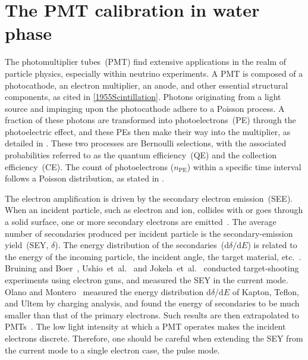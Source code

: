 \chapter{The PMT calibration in water phase}\label{sec:Introduction}
The photomultiplier tubes~(PMT) find extensive applications in the realm of particle physics, especially within neutrino experiments. A PMT is composed of a photocathode, an electron multiplier, an anode, and other essential structural components, as cited in \ref{1955Scintillation}. Photons originating from a light source and impinging upon the photocathode adhere to a Poisson process. A fraction of these photons are transformed into photoelectrons~(PE) through the photoelectric effect, and these PEs then make their way into the multiplier, as detailed in \cite{2016Optimization}. These two processes are Bernoulli selections, with the associated probabilities referred to as the quantum efficiency~(QE) and the collection efficiency~(CE). The count of photoelectrons ($n_{\mathrm{PE}}$) within a specific time interval follows a Poisson distribution, as stated in \cite{1994Absolute}.

The electron amplification is driven by the secondary electron emission~(SEE).
When an incident particle, such as electron and ion, collides with or goes through a solid surface, one or more secondary electrons are emitted~\cite{2016Secondary}.
The average number of secondaries produced per incident particle is the secondary-emission yield~(SEY, $\delta$).
The energy distribution of the secondaries~(\(\mathrm{d}\delta/\mathrm{d}E\)) is related to the energy of the incoming particle,
the incident angle, the target material, etc.~\cite{2002Probabilistic}.
Bruining and Boer~\cite{1938Secondary}, Ushio~et~al.~\cite{1988Secondary} and Jokela~et~al.~\cite{2012Secondary}
conducted target-shooting experiments using electron guns,
and measured the SEY in the current mode.
Olano and Montero~\cite{OLANO2020103456} measured the energy distribution \(\mathrm{d}\delta/\mathrm{d}E\) of Kapton, Teflon, and Ultem by charging analysis,
and found the energy of secondaries to be much smaller than that of the primary electrons.
Such results are then extrapolated to PMTs~\cite{2012An,2021Effects}.
The low light intensity at which a PMT operates makes the incident electrons discrete.
Therefore, one should be careful when extending the SEY from the current mode to a single electron case, the pulse mode.


